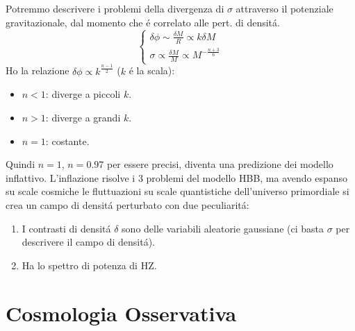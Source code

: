 \documentclass[12pt, a4paper]{article}
\begin{document}
Potremmo descrivere i problemi della divergenza di $\sigma$ attraverso il potenziale gravitazionale, dal momento che \'{e} correlato alle pert. di densit\'{a}.
\begin{equation}
\begin{cases}
\delta \phi \sim \frac{\delta M}{R}\propto k \delta M
\\
\sigma\propto \frac{\delta M}{M} \propto M^{-\frac{n+3}{6}}
\end{cases}
\end{equation}
Ho la relazione $\delta \phi \propto k^{\frac{n-1}{2}}$ ($k$ \'{e} la scala):
\begin{itemize}
\item $n<1$: diverge a piccoli $k$.
\item $n>1$: diverge a grandi $k$.
\item $n=1$: costante.
\end{itemize}
Quindi $n=1$, $n=0.97$ per essere precisi, diventa una predizione dei modello inflattivo. L'inflazione risolve i 3 problemi del modello HBB, ma avendo espanso su scale cosmiche le fluttuazioni su scale quantistiche dell'universo primordiale si crea un campo di densit\'{a} perturbato con due peculiarit\'{a}:
\begin{enumerate}
\item I contrasti di densit\'{a} $\delta$ sono delle variabili aleatorie gaussiane (ci basta $\sigma$ per descrivere il campo di densit\'{a}).
\item Ha lo spettro di potenza di HZ.
\end{enumerate}
\subsubsection{}



















\newpage
\section{Cosmologia Osservativa}
\end{document}
